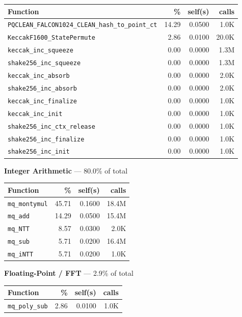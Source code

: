 \documentclass[11pt,a4paper]{article}
\begin{document}
\begin{longtable}{p{7.5cm}rrr}
\toprule
Function & \% & self(s) & calls \\
\midrule
\endhead
  \texttt{PQCLEAN\_FALCON1024\_CLEAN\_hash\_to\_point\_ct} & 14.29 & 0.0500 & 1.0K \\
  \texttt{KeccakF1600\_StatePermute} & 2.86 & 0.0100 & 20.0K \\
  \texttt{keccak\_inc\_squeeze} & 0.00 & 0.0000 & 1.3M \\
  \texttt{shake256\_inc\_squeeze} & 0.00 & 0.0000 & 1.3M \\
  \texttt{keccak\_inc\_absorb} & 0.00 & 0.0000 & 2.0K \\
  \texttt{shake256\_inc\_absorb} & 0.00 & 0.0000 & 2.0K \\
  \texttt{keccak\_inc\_finalize} & 0.00 & 0.0000 & 1.0K \\
  \texttt{keccak\_inc\_init} & 0.00 & 0.0000 & 1.0K \\
  \texttt{shake256\_inc\_ctx\_release} & 0.00 & 0.0000 & 1.0K \\
  \texttt{shake256\_inc\_finalize} & 0.00 & 0.0000 & 1.0K \\
  \texttt{shake256\_inc\_init} & 0.00 & 0.0000 & 1.0K \\
\bottomrule
\end{longtable}

\noindent\colorbox{intcolor}{\strut \textbf{Integer Arithmetic} --- 80.0\% of total}
\vspace{2pt}

\begin{longtable}{p{7.5cm}rrr}
\toprule
Function & \% & self(s) & calls \\
\midrule
\endhead
  \texttt{mq\_montymul} & 45.71 & 0.1600 & 18.4M \\
  \texttt{mq\_add} & 14.29 & 0.0500 & 15.4M \\
  \texttt{mq\_NTT} & 8.57 & 0.0300 & 2.0K \\
  \texttt{mq\_sub} & 5.71 & 0.0200 & 16.4M \\
  \texttt{mq\_iNTT} & 5.71 & 0.0200 & 1.0K \\
\bottomrule
\end{longtable}

\noindent\colorbox{fpcolor}{\strut \textbf{Floating-Point / FFT} --- 2.9\% of total}
\vspace{2pt}

\begin{longtable}{p{7.5cm}rrr}
\toprule
Function & \% & self(s) & calls \\
\midrule
\endhead
  \texttt{mq\_poly\_sub} & 2.86 & 0.0100 & 1.0K \\
\bottomrule
\end{longtable}
\end{document}
